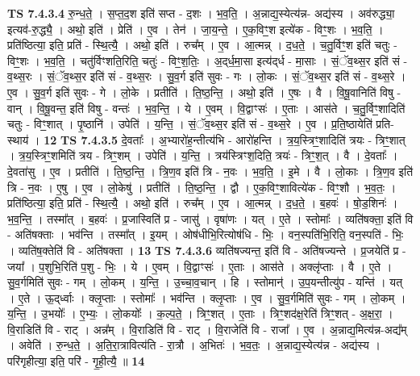 \documentclass[17pt]{extarticle}
\begin{document}
                  \newline
                                \textbf{ TS 7.4.3.4} \newline
                  रु॒न्ध॒ते॒ । स॒प्त॒द॒श इति॑ सप्त - द॒शः । भ॒व॒ति॒ । अ॒न्नाद्य॒स्येत्य॑न्न- अद्य॑स्य । अव॑रुद्ध्या॒ इत्यव॑-रु॒द्ध्यै॒ । अथो॒ इति॑ । प्रेति॑ । ए॒व । तेन॑ । जा॒य॒न्ते॒ । ए॒क॒विꣳ॒॒श इत्ये॑क - विꣳ॒॒शः । भ॒व॒ति॒ । प्रति॑ष्ठित्या॒ इति॒ प्रति॑ - स्थि॒त्यै॒ । अथो॒ इति॑ । रुच᳚म् । ए॒व । आ॒त्मन्न् । द॒ध॒ते॒ । च॒तु॒र्विꣳ॒॒श इति॑ चतुः - विꣳ॒॒शः । भ॒व॒ति॒ । चतु॑र्विꣳशति॒रिति॒ चतुः॑ - विꣳ॒॒श॒तिः॒ । अ॒द्‌र्ध॒मा॒सा इत्य॑द्‌र्ध - मा॒साः । सं॒ॅव॒थ्स॒र इति॑ सं - व॒थ्स॒रः । सं॒ॅव॒थ्स॒र इति॑ सं - व॒थ्स॒रः । सु॒व॒र्ग इति॑ सुवः - गः । लो॒कः । सं॒ॅव॒थ्स॒र इति॑ सं - व॒थ्स॒रे । ए॒व । सु॒व॒र्ग इति॑ सुवः - गे । लो॒के । प्रतीति॑ । ति॒ष्ठ॒न्ति॒ । अथो॒ इति॑ । ए॒षः । वै । वि॒षू॒वानिति॑ विषु - वान् । वि॒षू॒वन्त॒ इति॑ विषु - वन्तः॑ । भ॒व॒न्ति॒ । ये । ए॒वम् । वि॒द्वाꣳसः॑ । ए॒ताः । आस॑ते । च॒तु॒र्विꣳ॒॒शादिति॑ चतुः - विꣳ॒॒शात् । पृ॒ष्ठानि॑ । उपेति॑ । य॒न्ति॒ । सं॒ॅव॒थ्स॒र इति॑ सं - व॒थ्स॒रे । ए॒व । प्र॒ति॒ष्ठायेति॑ प्रति-स्थाय॑ । \textbf{  12} \newline
                  \newline
                                \textbf{ TS 7.4.3.5} \newline
                  दे॒वताः᳚ । अ॒भ्यारो॑ह॒न्तीत्य॑भि - आरो॑हन्ति । त्र॒य॒स्त्रिꣳ॒॒शादिति॑ त्रयः - त्रिꣳ॒॒शात् । त्र॒य॒स्त्रिꣳ॒॒शमिति॑ त्रय - त्रिꣳ॒॒शम् । उपेति॑ । य॒न्ति॒ । त्रय॑स्त्रिꣳश॒दिति॒ त्रयः॑ - त्रिꣳ॒॒श॒त् । वै । दे॒वताः᳚ । दे॒वता॑सु । ए॒व । प्रतीति॑ । ति॒ष्ठ॒न्ति॒ । त्रि॒ण॒व इति॑ त्रि - न॒वः । भ॒व॒ति॒ । इ॒मे । वै । लो॒काः । त्रि॒ण॒व इति॑ त्रि - न॒वः । ए॒षु । ए॒व । लो॒केषु॑ । प्रतीति॑ । ति॒ष्ठ॒न्ति॒ । द्वौ । ए॒क॒विꣳ॒॒शावित्ये॑क - विꣳ॒॒शौ । भ॒व॒तः॒ । प्रति॑ष्ठित्या॒ इति॒ प्रति॑ - स्थि॒त्यै॒ । अथो॒ इति॑ । रुच᳚म् । ए॒व । आ॒त्मन्न् । द॒ध॒ते॒ । ब॒हवः॑ । षो॒ड॒शिनः॑ । भ॒व॒न्ति॒ । तस्मा᳚त् । ब॒हवः॑ । प्र॒जास्विति॑ प्र - जासु॑ । वृषा॑णः । यत् । ए॒ते । स्तोमाः᳚ । व्यति॑षक्ता॒ इति॑ वि - अति॑षक्ताः । भव॑न्ति । तस्मा᳚त् । इ॒यम् । ओष॑धीभि॒रित्योष॑धि - भिः॒ । वन॒स्पति॑भि॒रिति॒ वन॒स्पति॑ - भिः॒ । व्यति॑ष॒क्तेति॑ वि - अति॑षक्ता । \textbf{  13} \newline
                  \newline
                                \textbf{ TS 7.4.3.6} \newline
                  व्यति॑षज्यन्त॒ इति॑ वि - अति॑षज्यन्ते । प्र॒जयेति॑ प्र - जया᳚ । प॒शुभि॒रिति॑ प॒शु - भिः॒ । ये । ए॒वम् । वि॒द्वाꣳसः॑ । ए॒ताः । आस॑ते । अक्लृ॑प्ताः । वै । ए॒ते । सु॒व॒र्गमिति॑ सुवः - गम् । लो॒कम् । य॒न्ति॒ । उ॒च्चा॒व॒चान् । हि । स्तोमान्॑ । उ॒प॒यन्तीत्यु॑प - यन्ति॑ । यत् । ए॒ते । ऊ॒द्‌र्ध्वाः । क्लृ॒प्ताः । स्तोमाः᳚ । भव॑न्ति । क्लृ॒प्ताः । ए॒व । सु॒व॒र्गमिति॑ सुवः - गम् । लो॒कम् । य॒न्ति॒ । उ॒भयोः᳚ । ए॒भ्यः॒ । लो॒कयोः᳚ । क॒ल्प॒ते॒ । त्रिꣳ॒॒शत् । ए॒ताः । त्रिꣳ॒॒शद॑क्ष॒रेति॑ त्रिꣳ॒॒शत् - अ॒क्ष॒रा॒ । वि॒राडिति॑ वि - राट् । अन्न᳚म् । वि॒राडिति॑ वि - राट् । वि॒राजेति॑ वि - राजा᳚ । ए॒व । अ॒न्नाद्य॒मित्य॑न्न-अद्य᳚म् । अवेति॑ । रु॒न्ध॒ते॒ । अ॒ति॒रा॒त्रावित्य॑ति - रा॒त्रौ । अ॒भितः॑ । भ॒व॒तः॒ । अ॒न्नाद्य॒स्येत्य॑न्न - अद्य॑स्य । परि॑गृहीत्या॒ इति॒ परि॑ - गृ॒ही॒त्यै॒ ॥ \textbf{  14 } \newline
\end{document}
